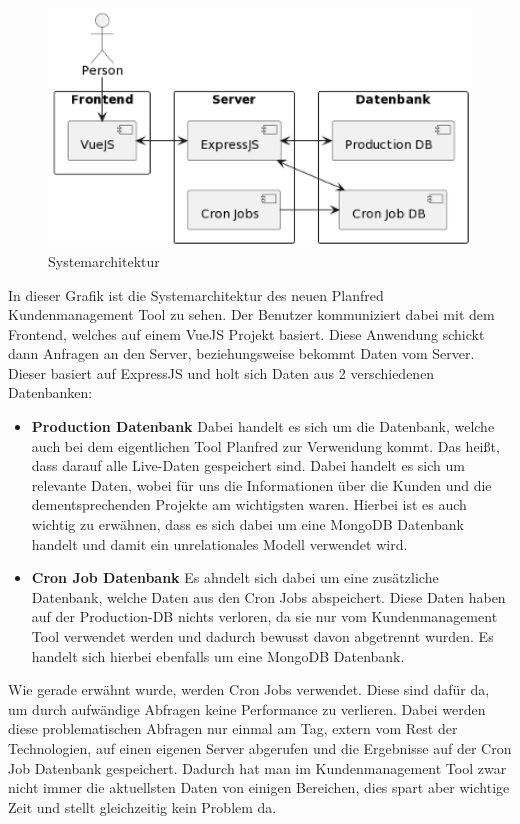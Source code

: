 \begin{figure}[h!]
    \centering
    \includegraphics[width=1\textwidth]{pics/diplomarbeit-architektur.png}
    \caption{Systemarchitektur}
    \label{fig:mesh1}
\end{figure}

In dieser Grafik ist die Systemarchitektur des neuen Planfred Kundenmanagement Tool zu sehen. Der Benutzer kommuniziert dabei mit dem Frontend, welches auf einem VueJS Projekt basiert. Diese Anwendung schickt dann Anfragen an den Server, beziehungsweise bekommt Daten vom Server. Dieser basiert auf ExpressJS und holt sich Daten aus 2 verschiedenen Datenbanken:

\begin{itemize}
    \item \textbf{Production Datenbank}
        \newline
        Dabei handelt es sich um die Datenbank, welche auch bei dem eigentlichen Tool Planfred zur Verwendung kommt. Das heißt, dass darauf alle Live-Daten gespeichert sind. Dabei handelt es sich um relevante Daten, wobei für uns die Informationen über die Kunden und die dementsprechenden Projekte am wichtigsten waren.
        Hierbei ist es auch wichtig zu erwähnen, dass es sich dabei um eine MongoDB Datenbank handelt und damit ein unrelationales Modell verwendet wird.

    \item \textbf{Cron Job Datenbank}
        \newline
        Es ahndelt sich dabei um eine zusätzliche Datenbank, welche Daten aus den Cron Jobs abspeichert. Diese Daten haben auf der Production-DB nichts verloren, da sie nur vom Kundenmanagement Tool verwendet werden und dadurch bewusst davon abgetrennt wurden.
        Es handelt sich hierbei ebenfalls um eine MongoDB Datenbank.
\end{itemize}

Wie gerade erwähnt wurde, werden Cron Jobs verwendet. Diese sind dafür da, um durch aufwändige Abfragen keine Performance zu verlieren. Dabei werden diese problematischen Abfragen nur einmal am Tag, extern vom Rest der Technologien, auf einen eigenen Server abgerufen und die Ergebnisse auf der Cron Job Datenbank gespeichert. Dadurch hat man im Kundenmanagement Tool zwar nicht immer die aktuellsten Daten von einigen Bereichen, dies spart aber wichtige Zeit und stellt gleichzeitig kein Problem da.
